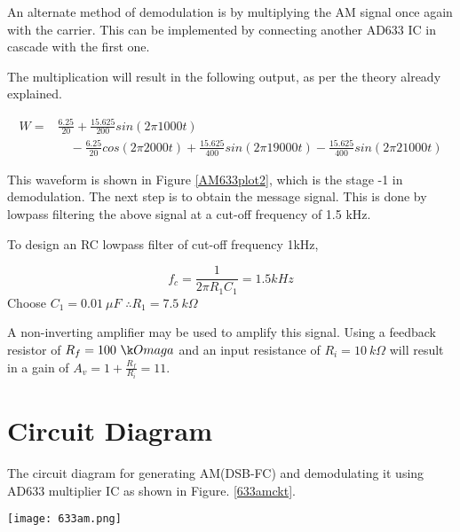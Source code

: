 An alternate method of demodulation is by multiplying the AM signal once again with the carrier. This can be implemented by connecting another AD633 IC in cascade with the first one.

\noindent The multiplication will result in the following output, as per the theory already explained.

\begin{equation}
\begin{split}
W=& \frac{6.25}{20} +\frac{15.625}{200}sin(2\pi 1000 t)\\
&\quad  -\frac{6.25}{20}cos(2\pi 2000t) +\frac{15.625}{400}sin(2\pi19000t) -\frac{15.625}{400}sin(2\pi 21000t)
\end{split}
\end{equation}

\noindent This waveform is shown in Figure \ref{AM633plot2}, which is the stage -1 in demodulation. The next step is to obtain the message signal. This is done by lowpass filtering the above signal at a cut-off frequency of 1.5 kHz.

To design an RC lowpass filter of cut-off frequency 1kHz,

\begin{equation}
f_c=\frac{1}{2\pi R_1C_1}=1.5kHz
\end{equation}
Choose $C_1=0.01\  \mu F$
$\therefore  R_1 =7.5 \ k \Omega$

A non-inverting amplifier may be used to amplify this signal. Using a feedback resistor of $R_f= 100 \ \k Omaga$ and an input resistance of $R_i=10\ k\Omega$ will result in a gain of $A_v=1+\frac{R_f}{R_i}=11$.
\section*{Circuit Diagram}
The circuit diagram for generating AM(DSB-FC) and demodulating it using AD633 multiplier IC as shown in Figure. \ref{633amckt}. 

\begin{sidewaysfigure}[ht]
    \texttt{[image: 633am.png]}
    \caption{Circuit for AM generation and detection using AD633 multiplier IC}
    \label{633amckt}
\end{sidewaysfigure}


